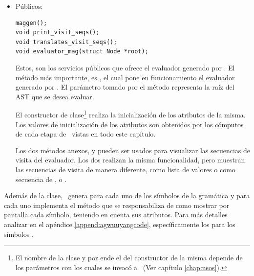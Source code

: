 \begin{description}
\begin{itemize}
El método  recorre el AST de entrada al evaluador y asigna a cada nodo un plan de evaluación\footnote{Los planes que asigna el método traverse son los generados estáticamente por \maggen.} y con ello una secuencia de visita correspondiente.

 y  agregan planes y planes proyectados respectivamente, los mismos son usados en la inicialización del evaluador (constructor de clase).

\item Públicos:

\begin{lstlisting}[backgroundcolor=\color{white}, columns=fullflexible, linewidth=7cm]
maggen();
void print_visit_seqs();
void translates_visit_seqs();
void evaluator_mag(struct Node *root);
\end{lstlisting}

Estos, son los servicios públicos que ofrece el evaluador generado por \maggen. El método más importante, es , el cual pone en funcionamiento el evaluador generado por \maggen. El parámetro tomado por el método representa la raíz del AST que se desea evaluar.

El constructor de clase\footnote{El nombre de la clase y por ende el del constructor de la misma depende de los parámetros con los cuales se invocó a \maggen\ (Ver capítulo \ref{chap:usos}).} realiza la inicialización de los atributos de la misma. Los valores de inicialización de los atributos son obtenidos por los cómputos de cada etapa de \maggen\ vistas en todo este capítulo.

Los dos métodos anexos,  y  pueden ser usados para visualizar las secuencias de visita del evaluador. Los dos realizan la misma funcionalidad, pero muestran las secuencias de visita de manera diferente, como lista de valores o como secuencia de ,  o .
\end{itemize}
\end{description}

Además de la clase, \maggen\ genera  para cada uno de los símbolos de la gramática y para cada uno implementa el método  que se responsabiliza de como mostrar por pantalla cada símbolo, teniendo en cuenta sus atributos. Para más detalles analizar en el apéndice \ref{append:agwuuyangcode}, específicamente los  para los símbolos .

